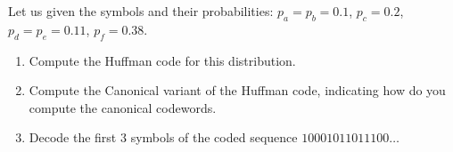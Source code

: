 \exercise

Let us given the symbols and their probabilities: $p_a = p_b = 0.1$, $p_c =
0.2$, $p_d = p_e = 0.11$, $p_f = 0.38$.
%
\begin{enumerate}

  \item Compute the Huffman code for this distribution.

  \item Compute the Canonical variant of the Huffman code, indicating how do you
  compute the canonical codewords.

  \item Decode the first 3 symbols of the coded sequence $10001011011100\dots$

\end{enumerate}

\solution

